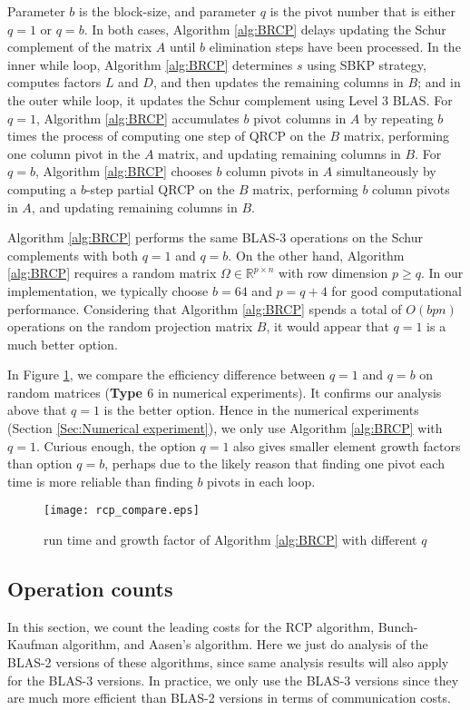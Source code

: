\documentclass[11pt]{article}
\begin{document}
Parameter $b$ is the block-size, and parameter $q$ is the pivot number that is either $q = 1$ or $q = b$. In both cases, Algorithm \ref{alg:BRCP} delays updating the Schur complement of the matrix $A$ until $b$ elimination steps have been processed. In the inner while loop, Algorithm \ref{alg:BRCP} determines $s$ using SBKP strategy, computes factors $L$ and $D$, and then updates the remaining columns in $B$; and in the outer while loop, it updates the Schur complement using Level $3$ BLAS. For $q = 1$, Algorithm \ref{alg:BRCP} accumulates $b$ pivot columns in $A$ by repeating $b$ times the process of computing one step of QRCP on the $B$ matrix, performing one column pivot in the $A$ matrix, and updating remaining columns in $B$. For $q = b$, Algorithm \ref{alg:BRCP} chooses $b$ column pivots in $A$ simultaneously by computing a $b$-step partial QRCP on the $B$ matrix, performing $b$ column pivots in $A$, and updating remaining columns in $B$.

Algorithm \ref{alg:BRCP} performs the same BLAS-3 operations on the Schur complements with both $q=1$ and $q=b$. On the other hand,  Algorithm \ref{alg:BRCP} requires a random matrix $\Omega \in \mathbb{R}^{p \times n}$ with row dimension $p \ge q$. In our implementation, we typically choose $b = 64$  and $p = q + 4$ for good computational performance. Considering that Algorithm \ref{alg:BRCP} spends a total of $O(b p n)$ operations on the random projection matrix $B$, 
it would appear that $q = 1$ is a much better option. 

In Figure \ref{Fig:Run time and growth factor between three RCP}, we compare the efficiency difference between $q=1$ and $q=b$ on random matrices ({\bf Type $6$} in numerical experiments). It confirms our analysis above that $q=1$ is the better option. Hence in the numerical experiments (Section \ref{Sec:Numerical experiment}), we only use Algorithm \ref{alg:BRCP} with $q=1$. Curious enough, the option $q=1$ also gives smaller element growth factors than option $q=b$, perhaps due to the likely reason that finding one pivot each time is more reliable than finding $b$ pivots in each loop.

\begin{figure}[htbp]
\centering
\texttt{[image: rcp\_compare.eps]}
\caption{run time and growth factor of Algorithm \ref{alg:BRCP} with different $q$}\label{Fig:Run time and growth factor between three RCP}
\end{figure}

\subsection{Operation counts}
In this section, we count the leading costs for the RCP algorithm, Bunch-Kaufman algorithm, and Aasen's algorithm. Here we just do analysis of the BLAS-2 versions of these algorithms, since same analysis results will also apply for the BLAS-3 versions. In practice, we only use the BLAS-3 versions since they are much more efficient than BLAS-2 versions in terms of communication costs.  
\end{document}
